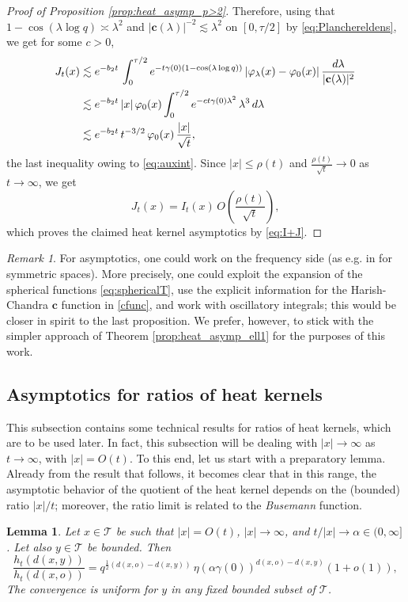 \documentclass[11pt,a4paper,reqno]{amsart}
\renewcommand\mathcal{\mathscr}
\theoremstyle{plain}
\newtheorem{lemma}[theorem]{Lemma}
\theoremstyle{remark}
\newtheorem{remark}[theorem]{Remark}
\theoremstyle{definition}
\theoremstyle{remark}
\numberwithin{equation}{section}
\def\int{\intop\nolimits}
\begin{document}
\begin{proof}[Proof of Proposition \ref{prop:heat_asymp_p>2}]
		Therefore, using that $1-\cos(\lambda \log q)\asymp \lambda^2$ and  $|\textbf{c}(\lambda)|^{-2}\lesssim \lambda^2$ on $[0, \tau/2]$ by \eqref{eq:Planchereldens}, we get for some $c>0$,
		\begin{align*}
			J_t(x)&\lesssim e^{-b_2t}\, \int_{0}^{\tau /2}e^{-t\gamma(0)(1-\cos(\lambda\log q))}\left|\varphi_{\lambda}(x)-\varphi_0(x)\right|\frac{d \lambda}{|\textbf{c}(\lambda)|^2}\\
			&\lesssim e^{-b_2t}\, |x|\, \varphi_0(x)\int_{0}^{\tau /2}e^{-ct\gamma(0)\lambda^2}\, \lambda^3\, d\lambda\\
			&\lesssim e^{-b_2t}\,t^{-3/2}\, \varphi_0(x)\, \frac{|x|}{\sqrt{t}},
		\end{align*}
		the last inequality owing to \eqref{eq:auxint}. Since $|x|\leq \rho(t)$ and $\frac{\rho(t)}{\sqrt{t}}\to 0$ as $t\to \infty$, we get
		$$J_t(x)=I_t(x)\, O\left(\frac{\rho(t)}{\sqrt{t}}\right),$$
		which proves the claimed heat kernel asymptotics  by \eqref{eq:I+J}.
	\end{proof}
	
\begin{remark} 
For asymptotics, one could work on the frequency side (as e.g. in \cite[Section 5]{AJ99} for symmetric spaces). More precisely, one could exploit the expansion of the spherical functions \eqref{eq:sphericalT}, use the explicit information for the Harish-Chandra $\textbf{c}$ function in \eqref{cfunc}, and work with oscillatory integrals; this would be closer in spirit to the last proposition. We prefer, however, to stick with the simpler approach of Theorem \ref{prop:heat_asymp_ell1} for the purposes of this work.
\end{remark}


	\subsection{Asymptotics for ratios of heat kernels}
	This subsection contains some technical results for ratios of heat kernels, which are to be used later. In fact, this subsection will be dealing with $|x|\to \infty$ as $t\to \infty$, with $|x|=O(t)$. To this end, let us start with a preparatory lemma. Already from the result that follows, it becomes clear that in this range, the asymptotic behavior of the quotient of the heat kernel depends on the (bounded) ratio $|x|/t$; moreover, the ratio limit is related to the \textit{Busemann} function.


   \begin{lemma}\label{lemma:quotient_prep}
    Let $x\in \mathcal{T}$ be such that $|x|=O(t)$, $|x|\to \infty$, and $t/|x|\to \alpha \in (0, \infty]$. Let also $y\in \mathcal{T}$ be bounded. Then
\[
\frac{h_t(d(x,y))}{h_t(d(x,o))}=q^{\frac{1}{2}(d(x,o)-d(x,y))}\, \eta(\alpha \gamma(0))^{d(x,o)-d(x,y)}(1+o(1)),
\]
The convergence is uniform for $y$ in any fixed bounded subset of $\mathcal T$.
    \end{lemma}
\end{document}
